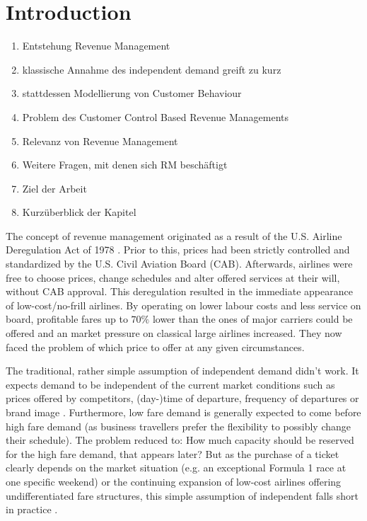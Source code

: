 \chapter{Introduction}

\begin{enumerate}[noitemsep]
	\item Entstehung Revenue Management
	\item klassische Annahme des independent demand greift zu kurz
	\item stattdessen Modellierung von Customer Behaviour
	\item Problem des Customer Control Based Revenue Managements
	\item Relevanz von Revenue Management
	\item Weitere Fragen, mit denen sich RM beschäftigt
	\item Ziel der Arbeit
	\item Kurzüberblick der Kapitel
\end{enumerate}

The concept of revenue management originated as a result of the U.S. Airline Deregulation Act of 1978 \cite{Talluri.2005}. Prior to this, prices had been strictly controlled and standardized by the U.S. Civil Aviation Board (CAB). Afterwards, airlines were free to choose prices, change schedules and alter offered services at their will, without CAB approval. This deregulation resulted in the immediate appearance of low-cost/no-frill airlines. By operating on lower labour costs and less service on board, profitable fares up to $70 \%$ lower than the ones of major carriers could be offered and an market pressure on classical large airlines increased. They now faced the problem of which price to offer at any given circumstances. 

The traditional, rather simple assumption of independent demand didn't work. It expects demand to be independent of the current market conditions such as prices offered by competitors, (day-)time of departure, frequency of departures or brand image \cite{Talluri.2005}. Furthermore, low fare demand is generally expected to come before high fare demand (as business travellers prefer the flexibility to possibly change their schedule). The problem reduced to: How much capacity should be reserved for the high fare demand, that appears later? But as the purchase of a ticket clearly depends on the market situation (e.g. an exceptional Formula 1 race at one specific weekend) or the continuing expansion of low-cost airlines offering undifferentiated fare structures, this simple assumption of independent falls short in practice \cite{Bront.2009}.

